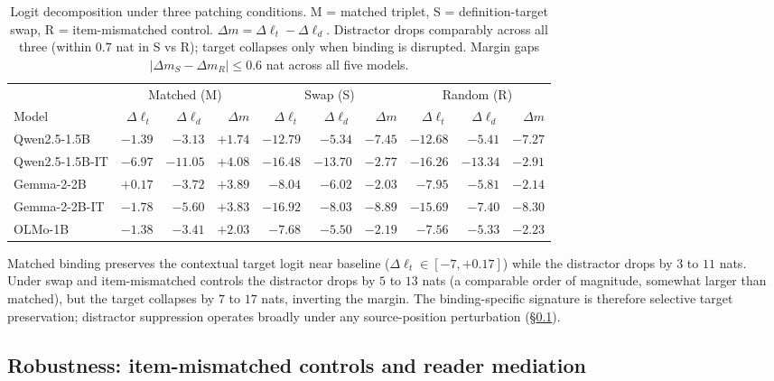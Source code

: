 \documentclass[11pt]{article}
\begin{document}
\begin{table}[t]
\centering
\scriptsize
\setlength{\tabcolsep}{3pt}
\begin{tabular*}{\textwidth}{@{\extracolsep{\fill}}lrrrrrrrrr@{}}
\toprule
& \multicolumn{3}{c}{Matched (M)} & \multicolumn{3}{c}{Swap (S)} & \multicolumn{3}{c}{Random (R)} \\
\cmidrule(lr){2-4} \cmidrule(lr){5-7} \cmidrule(lr){8-10}
Model & $\Delta\ell_t$ & $\Delta\ell_d$ & $\Delta m$ & $\Delta\ell_t$ & $\Delta\ell_d$ & $\Delta m$ & $\Delta\ell_t$ & $\Delta\ell_d$ & $\Delta m$ \\
\midrule
Qwen2.5-1.5B    & $-1.39$ & $-3.13$  & $+1.74$ & $-12.79$ & $-5.34$  & $-7.45$ & $-12.68$ & $-5.41$  & $-7.27$ \\
Qwen2.5-1.5B-IT & $-6.97$ & $-11.05$ & $+4.08$ & $-16.48$ & $-13.70$ & $-2.77$ & $-16.26$ & $-13.34$ & $-2.91$ \\
Gemma-2-2B      & $+0.17$ & $-3.72$  & $+3.89$ & $-8.04$  & $-6.02$  & $-2.03$ & $-7.95$  & $-5.81$  & $-2.14$ \\
Gemma-2-2B-IT   & $-1.78$ & $-5.60$  & $+3.83$ & $-16.92$ & $-8.03$  & $-8.89$ & $-15.69$ & $-7.40$  & $-8.30$ \\
OLMo-1B         & $-1.38$ & $-3.41$  & $+2.03$ & $-7.68$  & $-5.50$  & $-2.19$ & $-7.56$  & $-5.33$  & $-2.23$ \\
\bottomrule
\end{tabular*}
\caption{Logit decomposition under three patching conditions. M = matched triplet,
S = definition-target swap, R = item-mismatched control. $\Delta m = \Delta\ell_t -
\Delta\ell_d$. Distractor drops comparably across all three (within $0.7$ nat in S vs R);
target collapses only when binding is disrupted. Margin gaps
$|\Delta m_S - \Delta m_R| \leq 0.6$ nat across all five models.}
\label{tab:logit_decomp_all}
\end{table}

Matched binding preserves the contextual target logit near baseline ($\Delta\ell_t \in
[-7, +0.17]$) while the distractor drops by $3$ to $11$ nats. Under swap and item-mismatched
controls the distractor drops by $5$ to $13$ nats (a comparable order of magnitude, somewhat
larger than matched), but the target collapses by $7$ to $17$ nats, inverting the margin. The
binding-specific signature is therefore selective target preservation; distractor suppression
operates broadly under any source-position perturbation (\S\ref{sec:robustness}).

\subsection{Robustness: item-mismatched controls and reader mediation}
\label{sec:robustness}
\end{document}
